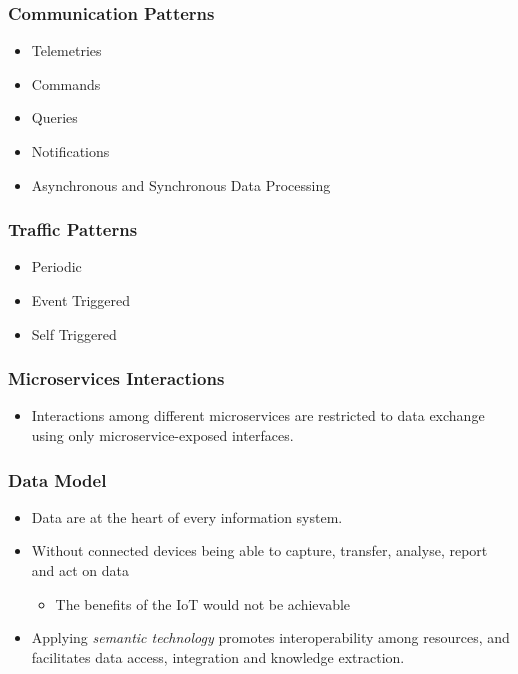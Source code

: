 \documentclass{../iot-lecture}
\begin{document}
\begin{frame}
  \frametitle{Communication Patterns}
  \begin{itemize}
    \item Telemetries
    \item Commands
    \item Queries
    \item Notifications
    \item Asynchronous and Synchronous Data Processing
  \end{itemize}
\end{frame}

\begin{frame}
  \frametitle{Traffic Patterns}
  \begin{itemize}
    \item Periodic
    \item Event Triggered
    \item Self Triggered
  \end{itemize}
\end{frame}

\begin{frame}
  \frametitle{Microservices Interactions}
  \begin{itemize}
    \item Interactions among different microservices are restricted to data exchange using only microservice-exposed interfaces.
  \end{itemize}
\end{frame}

\begin{frame}
  \frametitle{Data Model}
  \begin{itemize}
    \item Data are at the heart of every information system.
    \item Without connected devices being able to capture, transfer, analyse, report and act on data
    \begin{itemize}
      \item The benefits of the IoT would not be achievable
    \end{itemize}
    \item Applying \textit{\color{YellowOrange} semantic technology} promotes interoperability among resources, and facilitates data access, integration and knowledge extraction.
  \end{itemize}
\end{frame}
\end{document}
